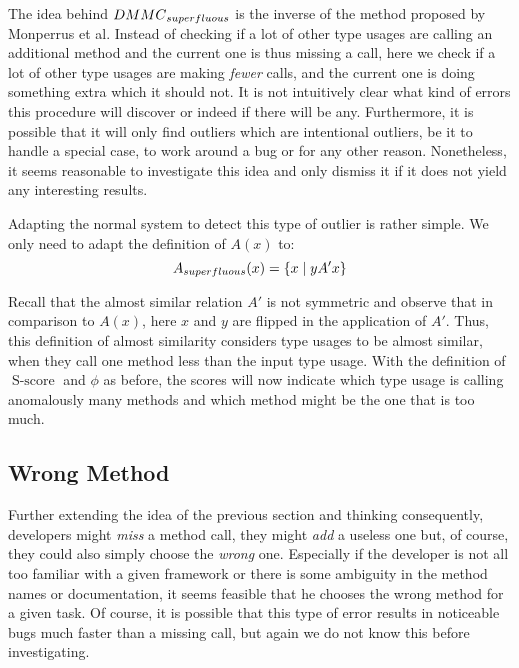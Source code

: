 The idea behind $\mathnormal{DMMC}_{\mathnormal{superfluous}}$ is the inverse of the method proposed by Monperrus et al.
Instead of checking if a lot of other type usages are calling an additional method and the current one is thus missing a call, here we check if a lot of other type usages are making \emph{fewer} calls, and the current one is doing something extra which it should not.
It is not intuitively clear what kind of errors this procedure will discover or indeed if there will be any.
Furthermore, it is possible that it will only find outliers which are intentional outliers, be it to handle a special case, to work around a bug or for any other reason.
Nonetheless, it seems reasonable to investigate this idea and only dismiss it if it does not yield any interesting results.

Adapting the normal system to detect this type of outlier is rather simple.
We only need to adapt the definition of $A(x)$ to:
\begin{equation*}
    A_{\mathnormal{superfluous}}(x) = \{x \mid yA'x \}
\end{equation*}

Recall that the almost similar relation $A'$ is not symmetric and observe that in comparison to $A(x)$, here $x$ and $y$ are flipped in the application of $A'$. 
Thus, this definition of almost similarity considers type usages to be almost similar, when they call one method less than the input type usage.
With the definition of $\operatorname{S-score}$ and $\phi$ as before, the scores will now indicate which type usage is calling anomalously many methods and which method might be the one that is too much.

\subsection{Wrong Method}

Further extending the idea of the previous section and thinking consequently, developers might \emph{miss} a method call, they might \emph{add} a useless one but, of course, they could also simply choose the \emph{wrong} one.
Especially if the developer is not all too familiar with a given framework or there is some ambiguity in the method names or documentation, it seems feasible that he chooses the wrong method for a given task.
Of course, it is possible that this type of error results in noticeable bugs much faster than a missing call, but again we do not know this before investigating.

